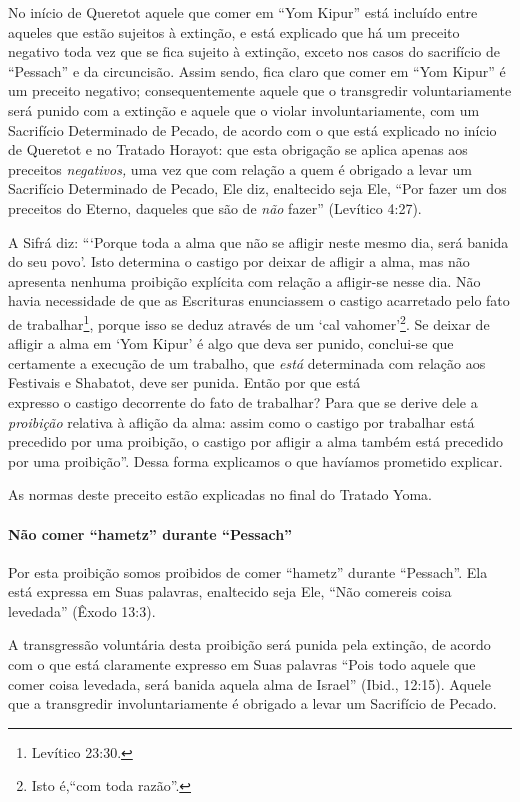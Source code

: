 No início de Queretot aquele que comer em ``Yom Kipur'' está incluído
entre aqueles que estão sujeitos à extinção, e está explicado que há
um preceito negativo toda vez que se fica sujeito à extinção, exceto nos
casos do sacrifício de ``Pessach'' e da circuncisão. Assim sendo, fica
claro que comer em ``Yom Kipur'' é um preceito negativo; consequentemente aquele que o
transgredir voluntariamente será punido com a extinção e aquele que o violar
involuntariamente, com um Sacrifício Determinado de Pecado, de acordo
com o que está explicado no início de Queretot e no Tratado Horayot: que
esta obrigação se aplica apenas aos preceitos \emph{negativos,} uma vez
que com relação a quem é obrigado a levar um Sacrifício Determinado de
Pecado, Ele diz, enaltecido seja Ele, ``Por fazer um dos preceitos do
Eterno, daqueles que são de \emph{não} fazer'' (Levítico 4:27).

A Sifrá diz: ```Porque toda a alma que não se afligir neste mesmo dia,
será banida do seu povo'. Isto determina o castigo por deixar de afligir
a alma, mas não apresenta nenhuma proibição explícita com relação a afligir-se
nesse dia. Não havia necessidade de que as Escrituras enunciassem o castigo
acarretado pelo fato de trabalhar\footnote{Levítico 23:30.}, porque isso se
deduz através de um `cal vahomer'\footnote{Isto é,``com toda razão''.}. Se deixar de
afligir a alma em `Yom Kipur' é algo que deva ser punido, conclui-se que
certamente a execução de um trabalho, que \emph{está} determinada com
relação aos Festivais e Shabatot, deve ser punida. Então por que está\\
expresso o castigo decorrente do fato de trabalhar? Para que se derive
dele a \emph{proibição} relativa à aflição da alma: assim como o castigo por
trabalhar está precedido por uma proibição, o castigo por afligir a alma
também está precedido por uma proibição''. Dessa forma explicamos o que havíamos prometido explicar.

As normas deste preceito estão explicadas no final do Tratado Yoma.

\paragraph{Não comer ``hametz'' durante ``Pessach''}

Por esta proibição somos proibidos de comer ``hametz'' durante
``Pessach''. Ela está expressa em Suas palavras, enaltecido seja Ele,
``Não comereis coisa levedada'' (Êxodo 13:3).

A transgressão voluntária desta proibição será punida pela extinção, de
acordo com o que está claramente expresso em Suas palavras ``Pois todo
aquele que comer coisa levedada, será banida aquela alma de Israel''
(Ibid., 12:15). Aquele que a transgredir involuntariamente é obrigado a
levar um Sacrifício de Pecado.

